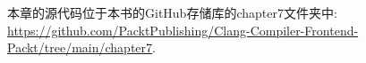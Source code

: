 本章的源代码位于本书的GitHub存储库的chapter7文件夹中: \url{https://github.com/PacktPublishing/Clang-Compiler-Frontend-Packt/tree/main/chapter7}.
